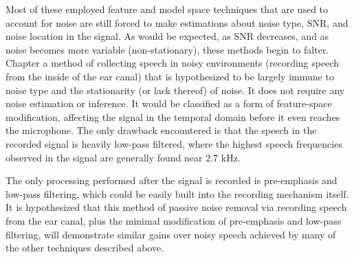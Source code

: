 Most of these employed feature and model space techniques that are used to account for noise are still forced to make estimations about noise type, SNR, and noise location in the signal.  As would be expected, as SNR decreases, and as noise becomes more variable (non-stationary), these methods begin to falter.  Chapter \DIFdelbegin {}\DIFdelend \DIFaddbegin {}\DIFaddend a method of collecting speech in noisy environments (recording speech from the inside of the ear canal) that is hypothesized to be largely immune to noise type and the stationarity (or lack thereof) of noise.  It does not require any noise estimation or inference.  It would be classified as a form of feature-space modification, affecting the signal in the temporal domain before it even reaches the microphone.  The only drawback encountered is that the speech in the recorded signal is heavily low-pass filtered, where the highest speech frequencies observed in the signal are generally found near 2.7 kHz.

The only processing performed after the signal is recorded is pre-emphasis and low-pass filtering, which could be easily built into the recording mechanism itself.  It is hypothesized that this method of passive noise removal via recording speech from the ear canal, plus the minimal modification of pre-emphasis and low-pass filtering, will demonstrate similar gains over noisy speech achieved by many of the other techniques described above.


